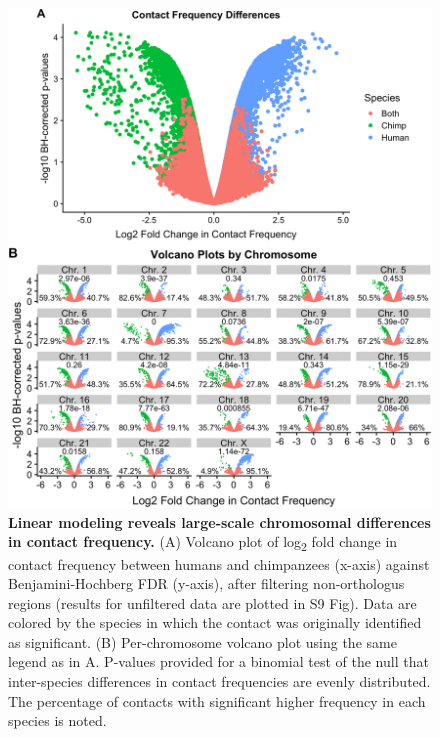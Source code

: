 \begin{figure}
\centering
\includegraphics[width=6in]{img/fig2.PNG}
\caption[Linear modeling reveals large-scale chromosomal differences in contact frequency.]{\textbf{Linear modeling reveals large-scale chromosomal differences in contact frequency.} (A) Volcano plot of log\textsubscript{2} fold change in contact frequency between humans and chimpanzees (x-axis) against Benjamini-Hochberg FDR (y-axis), after filtering non-orthologus regions (results for unfiltered data are plotted in S9 Fig). Data are colored by the species in which the contact was originally identified as significant. (B) Per-chromosome volcano plot using the same legend as in A. P-values provided for a binomial test of the null that inter-species differences in contact frequencies are evenly distributed. The percentage of contacts with significant higher frequency in each species is noted.}
\label{fig:fig2}
\end{figure}

